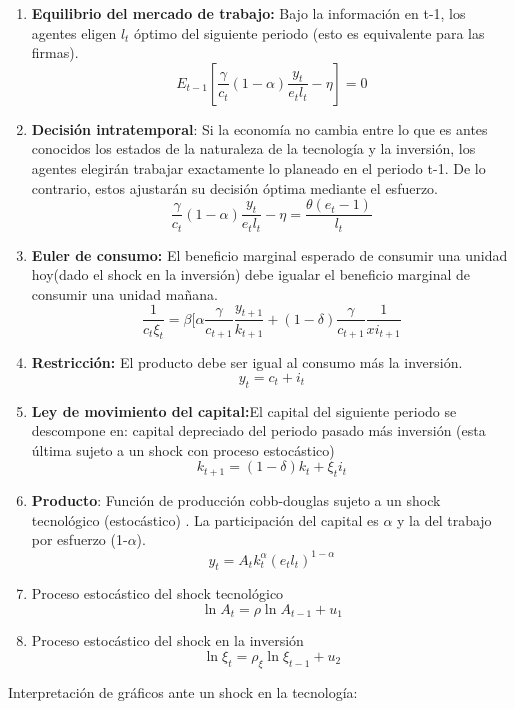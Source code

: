 \documentclass{article}
\begin{document}
	\begin{enumerate}
		
		\item  \textbf{Equilibrio del mercado de trabajo:} Bajo la información en t-1, los agentes eligen $l_t$ óptimo del siguiente periodo (esto es equivalente para las firmas).
		$$
		E_{t-1}[\frac {\gamma}{c_t}(1-\alpha)\frac {y_t}{e_t l_t}-\eta]=0
		$$
		
		\item \textbf{Decisión intratemporal}:  Si  la economía no cambia entre lo que es antes conocidos los estados de la naturaleza de la tecnología y la inversión, los agentes elegirán trabajar exactamente lo planeado en el periodo t-1. De lo contrario, estos ajustarán su decisión óptima mediante el esfuerzo.
		$$
		\frac{\gamma}{c_t}(1-\alpha)\frac{y_t}{e_t l_t}-\eta=\frac{\theta(e_t-1)}{l_t}
		$$
		
		\item \textbf{Euler de consumo:} El beneficio marginal esperado de consumir una unidad hoy(dado el shock en la inversión) debe igualar el beneficio marginal de consumir una unidad mañana.
		$$
		\frac{1}{c_t\xi_t}=\beta[\alpha\frac{\gamma}{c_{t+1}}\frac{y_{t+1}}{k_{t+1}}+(1-\delta) \frac{\gamma}{c_{t+1}} \frac{1}{xi_{t+1}}
		$$
		
		
		\item \textbf{Restricción:} El producto debe ser igual al consumo más la inversión.
		$$
		y_t=c_t+i_t
		$$
		
		\item \textbf{Ley de movimiento del capital:}El capital del siguiente periodo se descompone en: capital depreciado del periodo pasado más inversión (esta última sujeto a un shock con proceso estocástico)
		$$
		k_{t+1}=(1-\delta)k_t+\xi_ti_t
		$$
		\item \textbf{Producto}: Función de producción cobb-douglas sujeto a un shock tecnológico (estocástico) . La participación del capital es $\alpha$ y la del trabajo por esfuerzo (1-$\alpha$).
		$$
		y_t=A_t k_t^\alpha (e_tl_t)^{1-\alpha}
		$$
		\item Proceso estocástico del shock tecnológico
		$$
		\ln A_t=\rho \ln A_{t-1}+u_1
		$$
		\item Proceso estocástico del shock en la inversión
		$$
		\ln \xi_t=\rho_\xi \ln \xi_{t-1}+u_2
		$$
	\end{enumerate}
	
	Interpretación de gráficos ante un shock en la tecnología:
	
\end{document}
